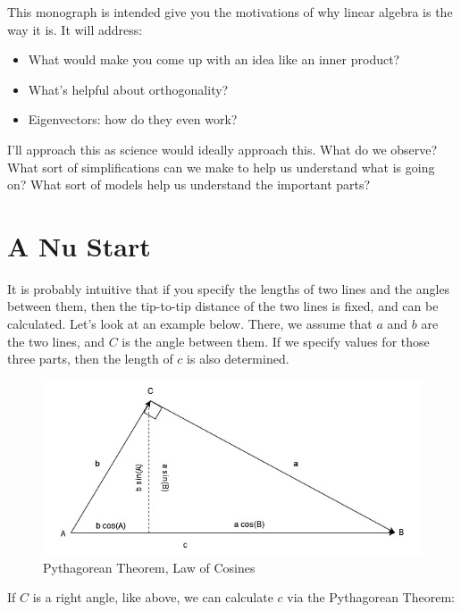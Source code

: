 \documentclass[
]{book}
\providecommand{\tightlist}{%
  \setlength{\itemsep}{0pt}\setlength{\parskip}{0pt}}
\begin{document}
This monograph is intended give you the motivations of why linear algebra is the way it is. It will address:

\begin{itemize}
\tightlist
\item
  What would make you come up with an idea like an inner product?
\item
  What's helpful about orthogonality?
\item
  Eigenvectors: how do they even work?
\end{itemize}

I'll approach this as science would ideally approach this. What do we observe? What sort of simplifications can we make to help us understand what is going on? What sort of models help us understand the important parts?

\hypertarget{a-nu-start}{%
\chapter{A Nu Start}\label{a-nu-start}}

It is probably intuitive that if you specify the lengths of two lines and the angles between them, then the tip-to-tip distance of the two lines is fixed, and can be calculated. Let's look at an example below. There, we assume that \(a\) and \(b\) are the two lines, and \(C\) is the angle between them. If we specify values for those three parts, then the length of \(c\) is also determined.

\begin{figure}

{\centering \includegraphics[width=0.75\linewidth,height=0.75\textheight]{images/LofC-PythThm} 

}

\caption{Pythagorean Theorem, Law of Cosines}\label{fig:unnamed-chunk-1}
\end{figure}

If \(C\) is a right angle, like above, we can calculate \(c\) via the Pythagorean Theorem:
\end{document}
